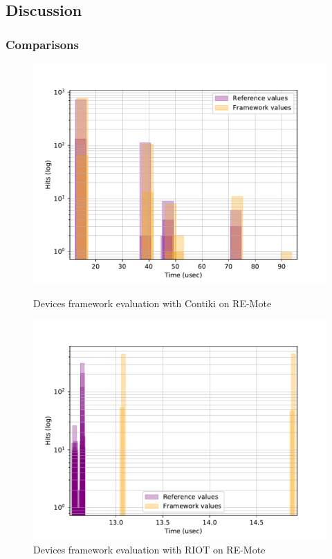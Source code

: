 \subsection{Discussion}

\subsubsection{Comparisons}

\begin{figure}[!ht]
  \begin{minipage}{.45\textwidth}
      \centering
      \includegraphics[scale=.4]{assets/comparison-devices-framework-contiki-remote.pdf}
      \caption{Devices framework evaluation with Contiki on RE-Mote\label{fig:comparison-devices-framework-contiki-remote}}
  \end{minipage}\hfill
  \begin{minipage}{.45\textwidth}        
      \centering
      \includegraphics[scale=.4]{assets/comparison-devices-framework-riot-remote.pdf}
      \caption{Devices framework evaluation with RIOT on RE-Mote\label{fig:comparison-devices-framework-riot-remote}}
  \end{minipage}
\end{figure}


